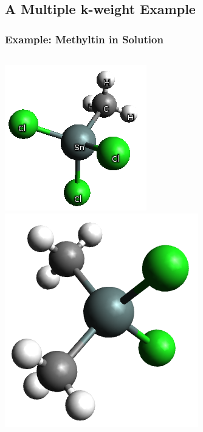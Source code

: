 \documentclass[10pt, xcolor=x11names, compress]{beamer}
\begin{document}
\subsection[Example]{A Multiple k-weight Example}
\begin{frame}[fragile,label=methyltin]
  \frametitle{Example: Methyltin in Solution}
  \begin{columns}[T]
    \begin{column}{0.6\linewidth}
      \qquad
      \includegraphics[width=0.3\linewidth]{mkw/monomethyltin.png}
      \qquad
      \includegraphics[width=0.3\linewidth]{mkw/dimethyltin.png}
      


\end{column}
\end{columns}
\end{frame}
\end{document}
